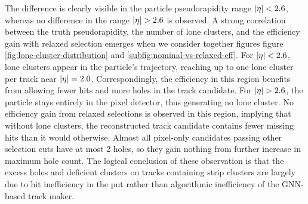 The difference is clearly visible in the particle pseudorapidity range $\abs{\eta}<2.6$, whereas no difference in the range $\abs{\eta}>2.6$ is observed.
A strong correlation between the truth pseudorapidity, the number of lone clusters, and the efficiency gain with relaxed selection emerges when we consider together figures figure \ref{fig:lone-cluster-distribution} and \ref{subfig:nominal-vs-relaxed-eff}.
For $\abs{\eta}<2.6$, lone clusters appear in the particle's trajectory, reaching up to one lone cluster per track near $\abs{\eta}=2.0$. 
Correspondingly, the efficiency in this region benefits from allowing fewer hits and more holes in the track candidate.
For $\abs{\eta}>2.6$, the particle stays entirely in the pixel detector, thus generating no lone cluster.
No efficiency gain from relaxed selections is observed in this region, implying that without lone clusters, the reconstructed track candidate contains fewer missing hits than it would otherwise. 
Almost all pixel-only candidates passing other selection cuts have at most 2 holes, so they gain nothing from further increase in maximum hole count. 
The logical conclusion of these observation is that the excess holes and deficient clusters on tracks containing strip clusters are largely due to hit inefficiency in the put rather than algorithmic inefficiency of the GNN-based track maker.

